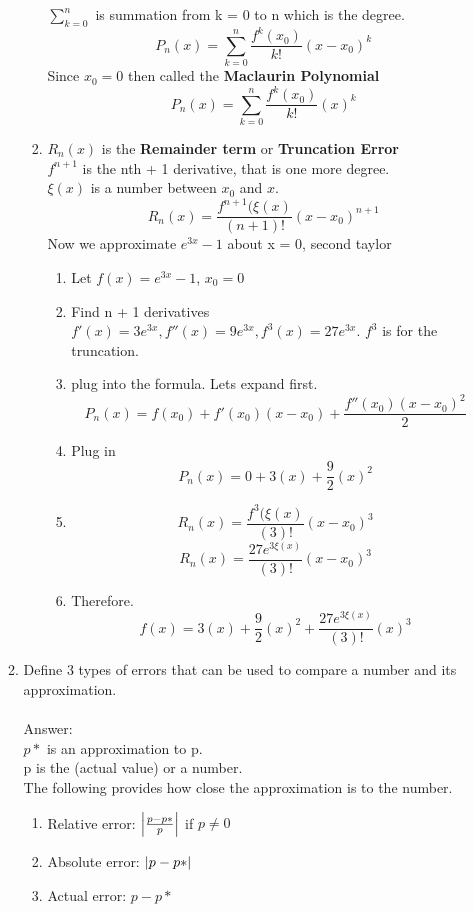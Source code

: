 \documentclass{article}
\begin{document}
\begin{enumerate}
\begin{enumerate}
\begin{enumerate}
                $\sum_{k = 0}^{n}$ is summation from k = 0 to n which is the degree.
                $$P_{n}(x) = \sum_{k = 0}^{n} \frac{f^{k}(x_0)}{k!}(x - x_0)^{k} $$
                Since $x_0 = 0$ then called the \textbf{Maclaurin Polynomial}
                $$P_{n}(x) = \sum_{k = 0}^{n} \frac{f^{k}(x_0)}{k!}(x)^{k} $$
                \item $R_n(x)$ is the \textbf{Remainder term} or \textbf{Truncation Error}\\
                $f^{n + 1}$ is the nth + 1 derivative, that is one more degree. \\
                $\xi(x)$ is a number between $x_0$ and $x$. 
                $$R_{n}(x) = \frac{f^{n + 1}(\xi(x)}{(n + 1)!}(x - x_0)^{n + 1}$$
                Now we approximate $e^{3x} - 1$ about x = 0, second taylor
                \begin{enumerate}
                    \item Let $f(x) = e^{3x} - 1$, $x_0 = 0$
                    \item Find n + 1 derivatives $f'(x) = 3e^{3x}, f''(x) = 9e^{3x}, f^3(x) = 27e^{3x}$. $f^{3}$ is for the truncation. 
                    \item plug  into the formula. Lets expand first.
                    $$P_n(x) = f(x_0) + f'(x_0)(x - x_0) + \frac{f''(x_0)(x - x_0)^2}{2}$$
                    \item Plug in
                    $$P_n(x) = 0 + 3(x) + \frac{9}{2}(x)^2$$
                    \item 
                    $$R_{n}(x) = \frac{f^{3}(\xi(x)}{(3)!}(x - x_0)^{3}$$
                    $$R_{n}(x) = \frac{27e^{3\xi(x)}}{(3)!}(x - x_0)^{3}$$
                    \item Therefore. 
                    $$f(x) = 3(x) + \frac{9}{2}(x)^2 + \frac{27e^{3\xi(x)}}{(3)!}(x)^{3}$$
                \end{enumerate}
            \end{enumerate}
        \color{black}
        
        \item Define 3 types of errors that can be used to compare a number and its approximation.\\
        \\
        \color{red}
            Answer:\\
            $p*$ is an approximation to p. \\
            p is the (actual value) or a number.\\
            The following provides how close the approximation is to the number.\\
            \begin{enumerate}
                \item Relative error:  $\abs{\frac{p-p*}{p}}$ if $p \neq 0$
                \item Absolute error:  $\abs{p-p*}$
                \item Actual error:    $p-p*$
        \end{enumerate}
        \color{black}
    \end{enumerate}
        

\end{enumerate}
\end{document}
